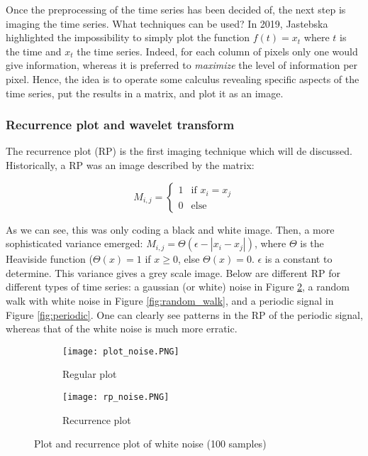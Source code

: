 \documentclass[11pt]{article}
\begin{document}
\begin{onehalfspace}
Once the preprocessing of the time series has been decided of, the next step is imaging the time series. What techniques can be used? In 2019, Jastebska \cite{jastrzebska} highlighted the impossibility to simply plot the function $f(t) = x_t$ where $t$ is the time and $x_t$ the time series. Indeed, for each column of pixels only one would give information, whereas it is preferred to \emph{maximize} the level of information per pixel. Hence, the idea is to operate some calculus revealing specific aspects of the time series, put the results in a matrix, and plot it as an image.

\subsubsection{Recurrence plot and wavelet transform}

The recurrence plot (RP) is the first imaging technique which will de discussed. Historically, a RP was an image described by the matrix: 

\begin{equation}
    M_{i,j} = \begin{cases}
        1 & \text{if } x_i = x_j \\
        0 & \text{else}
    \end{cases}
\end{equation}

As we can see, this was only coding a black and white image. Then, a more sophisticated variance emerged: $M_{i,j} = \Theta(\epsilon - |x_i - x_j|)$, where $ \Theta $ is the Heaviside function ($\Theta(x) = 1$ if $x \geq 0$, else $\Theta(x) = 0$. $\epsilon$ is a constant to determine. This variance gives a grey scale image. Below are different RP for different types of time series: a gaussian (or white) noise in Figure \ref{fig:white_noise}, a random walk with white noise in Figure \ref{fig:random_walk}, and a periodic signal in Figure \ref{fig:periodic}. One can clearly see patterns in the RP of the periodic signal, whereas that of the white noise is much more erratic.

\begin{figure}[h!]
    \centering
    \captionsetup{justification=centering}
    \begin{subfigure}{0.4\textwidth}
        \texttt{[image: plot\_noise.PNG]}
        \caption{Regular plot}
        \label{fig:}
    \end{subfigure}
    \begin{subfigure}{0.4\textwidth}
        \texttt{[image: rp\_noise.PNG]}
        \caption{Recurrence plot}
    \end{subfigure}
    \caption{Plot and recurrence plot of white noise (100 samples)}
    \label{fig:white_noise}
\end{figure}


\end{onehalfspace}
\end{document}
